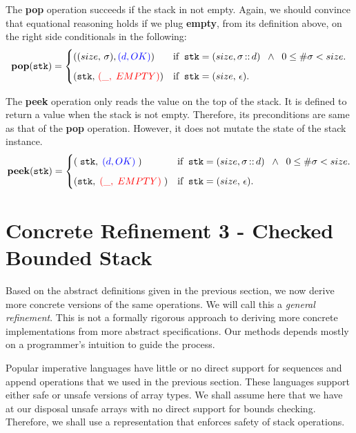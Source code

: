 \documentclass[10pt]{article}
\begin{document}
    The \textbf{pop} operation succeeds if the stack in not empty. Again, we should convince that equational reasoning holds if we plug \textbf{empty}, from its definition above, on the right side conditionals in the following:
    \[
        \mathtt{\mathbf{pop}(stk)} = \begin{cases} ((size, \, \sigma), {\textcolor{blue}{(d, OK)}}) & \mbox{if\;\;} \mathtt{stk} = (size, \sigma \,\mathbf{::} \,d) \;\; \wedge \;\; 0 
        \leq \#\sigma < size. \vspace*{6pt}\\ 
        (\mathtt{stk},\,{\textcolor{red}{(\_,\; EMPTY)}})  & \mbox{if\;\;}\mathtt{stk} = (size, \, \epsilon). \end{cases} 
    \]

    The \textbf{peek} operation only reads the value on the top of the stack. It is defined to return a value when the stack is not empty. Therefore, its preconditions are same as that of the \textbf{pop} operation. However, it does not mutate the state of the stack instance.
    \[
        \mathtt{\mathbf{peek}(stk)} = \begin{cases} (\; \mathtt{stk}, \; {\textcolor{blue}{(d, OK)}}\;) & \mbox{if\;\;} \mathtt{stk} = (size, \sigma\,\mathbf{::}\,d) \;\; \wedge\; \; 0 \leq \#\sigma < size. \vspace*{6pt}\\ 
        (\mathtt{stk},\; {\textcolor{red}{(\_,\; EMPTY)}}\;)  & \mbox{if\;\;} \mathtt{stk} = (size,\,\epsilon). \end{cases} 
    \]

  \section{Concrete Refinement 3 - Checked Bounded Stack}
    Based on the abstract definitions given in the previous section, we now derive more concrete versions of the same operations. We will call this a \emph{general refinement}. This is not a formally rigorous approach to deriving more concrete implementations from more abstract specifications. Our methods depends mostly on a programmer's intuition to guide the process.

    Popular imperative languages have little or no direct support for sequences and append operations that we used in the previous section. These languages support either safe or unsafe versions of array types. We shall assume here that we have at our disposal unsafe arrays with no direct support for bounds checking. Therefore, we shall use a representation that enforces safety of stack operations.
\end{document}
